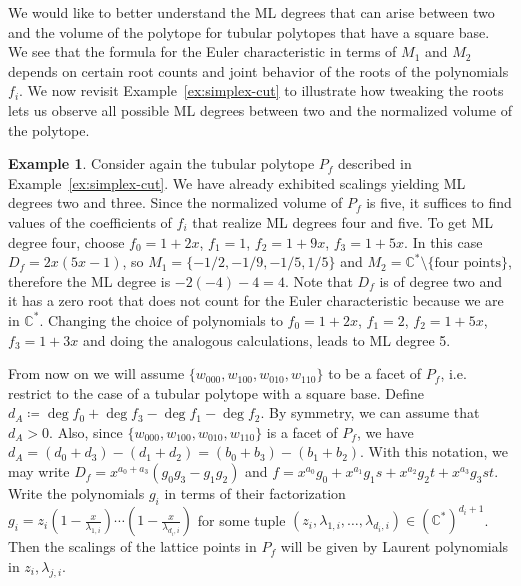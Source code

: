 \documentclass[12pt,reqno]{amsart}   	%
\theoremstyle{plain}
\theoremstyle{definition}
\newtheorem{example}[theorem]{Example}
\theoremstyle{remark}
\newcommand{\C}{\mathbb{C}}
\begin{document}
We would like to better understand the ML degrees that can arise between two and the volume of the polytope for tubular polytopes that have a square base. We see that the formula for the Euler characteristic in terms of $M_1$ and $M_2$ depends on certain root counts and joint
behavior of the roots of the polynomials $f_i$. We now revisit 
Example~\ref{ex:simplex-cut} to illustrate how tweaking the roots lets us observe all possible
ML degrees between two and the normalized volume of the polytope.

\begin{example}\label{ex:simplex-cut2}
Consider again the tubular polytope $P_f$ described in Example~\ref{ex:simplex-cut}. 
We have already exhibited scalings
yielding ML degrees two and three. 
Since the normalized volume of $P_f$ is five, it suffices to find values of the coefficients of $f_i$ that realize ML degrees four and five. To get ML degree four, choose $f_0=1+2x$, $f_1=1$, $f_2=1+9x$, $f_3=1+5x$. In this case $D_f= 2x(5x-1)$, so 
$M_1=\{-1/2,-1/9,-1/5,1/5\}$ and $M_2=\C^{\ast}\setminus \{\textrm{four points}\}$, therefore the ML degree is $-2(-4)-4=4$. Note that $D_f$ is of degree two and it has a zero root that does not count for the Euler characteristic because we are in $\C^{\ast}$.
Changing the choice of polynomials to 
$f_0=1+2x$, $f_1=2$, $f_2=1+5x$, $f_3=1+3x$ and doing the analogous calculations, leads to ML degree 5.
\end{example}

From now on we will assume $\{ w_{000},w_{100},w_{010},w_{110} \}$ to be a facet of $P_f$, i.e. restrict to the case of a tubular polytope with a square base.   
Define $d_A \coloneqq   \deg f_0 + \deg f_3 - \deg f_1 - \deg f_2$. By symmetry, we can assume that $d_A > 0$. Also, since $\{ w_{000},w_{100},w_{010},w_{110} \}$ is a facet of $P_f$, we have $d_A=(d_0+d_3)-(d_1+d_2)=(b_0+b_3)-(b_1+b_2)$.
With this notation, we may write $D_f=x^{a_0+a_3}(g_0g_3 - g_1g_2)$ and $f=x^{a_0}g_0+x^{a_1}g_1s+x^{a_2}g_2t+x^{a_3}g_3st$. Write the polynomials $g_i$ in terms of their factorization $g_i=z_i(1-\frac{x}{\lambda_{1,i}})\cdots (1-\frac{x}{\lambda_{d_i,i}})$ for some tuple $(z_i, \lambda_{1,i},\ldots,\lambda_{d_i,i}) \in (\C^{\ast})^{d_i+1}$. 
Then the scalings of the lattice points in $P_f$ will be given by Laurent polynomials in $z_i, \lambda_{j,i}$. 
\end{document}
